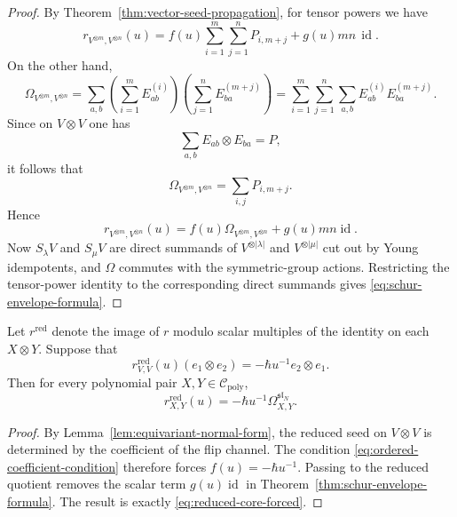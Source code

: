 \begin{proof}
By Theorem~\ref{thm:vector-seed-propagation}, for tensor powers we have
\begin{equation}
r_{V^{\otimes m},V^{\otimes n}}(u)
=
f(u)\sum_{i=1}^{m}\sum_{j=1}^{n}P_{i,m+j}
+g(u)mn\,\operatorname{id}.
\end{equation}
On the other hand,
\begin{equation}
\Omega_{V^{\otimes m},V^{\otimes n}}
=
\sum_{a,b}\left(\sum_{i=1}^{m}E_{ab}^{(i)}\right)
\left(\sum_{j=1}^{n}E_{ba}^{(m+j)}\right)
=
\sum_{i=1}^{m}\sum_{j=1}^{n} \sum_{a,b}E_{ab}^{(i)}E_{ba}^{(m+j)}.
\end{equation}
Since on $V\otimes V$ one has
\begin{equation}
\sum_{a,b}E_{ab}\otimes E_{ba}=P,
\end{equation}
it follows that
\begin{equation}
\Omega_{V^{\otimes m},V^{\otimes n}}=\sum_{i,j}P_{i,m+j}.
\end{equation}
Hence
\begin{equation}
r_{V^{\otimes m},V^{\otimes n}}(u)
=
f(u)\Omega_{V^{\otimes m},V^{\otimes n}}+g(u)mn\operatorname{id}.
\end{equation}
Now $S_\lambda V$ and $S_\mu V$ are direct summands of
$V^{\otimes |\lambda|}$ and $V^{\otimes |\mu|}$ cut out by Young
idempotents, and $\Omega$ commutes with the symmetric-group actions.
Restricting the tensor-power identity to the corresponding direct summands
gives \eqref{eq:schur-envelope-formula}.
\end{proof}

\begin{corollary}
\ClaimStatusProvedHere
\label{cor:one-coefficient-forces-reduced-core}
Let $r^{\mathrm{red}}$ denote the image of $r$ modulo scalar multiples of
the identity on each $X\otimes Y$. Suppose that
\begin{equation}
\label{eq:ordered-coefficient-condition}
r^{\mathrm{red}}_{V,V}(u)(e_1\otimes e_2)
=
-\hbar u^{-1}e_2\otimes e_1.
\end{equation}
Then for every polynomial pair $X,Y\in \mathcal C_{\mathrm{poly}}$,
\begin{equation}
\label{eq:reduced-core-forced}
r^{\mathrm{red}}_{X,Y}(u)
=
-\hbar u^{-1}\Omega^{\mathfrak{sl}_N}_{X,Y}.
\end{equation}
\end{corollary}

\begin{proof}
By Lemma~\ref{lem:equivariant-normal-form}, the reduced seed on
$V\otimes V$ is determined by the coefficient of the flip channel. The
condition \eqref{eq:ordered-coefficient-condition} therefore forces
$f(u)=-\hbar u^{-1}$. Passing to the reduced quotient removes the scalar
term $g(u)\operatorname{id}$ in
Theorem~\ref{thm:schur-envelope-formula}. The result is exactly
\eqref{eq:reduced-core-forced}.
\end{proof}

